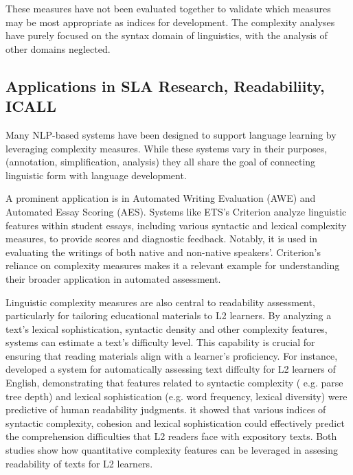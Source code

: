 These measures have
not been evaluated together to validate which measures may be most appropriate as indices for development. The
complexity analyses have purely focused on the syntax domain of linguistics, with the
analysis of other domains neglected.

\subsection{Applications in SLA Research, Readabiliity, ICALL}

Many NLP-based systems have been designed to support language learning by leveraging complexity measures. While these
systems
vary
in their purposes, (annotation, simplification, analysis) they all
share
the goal
of connecting linguistic form with language development.

A prominent application is in Automated Writing Evaluation (AWE) and Automated Essay Scoring (AES). Systems like
ETS's Criterion \citep{criterion2006} analyze linguistic features within student essays, including various syntactic
and lexical complexity measures, to provide scores and diagnostic feedback. Notably, it is used in evaluating
the writings of both native and non-native speakers'.
 Criterion's reliance on complexity measures makes it a relevant example for
understanding their broader application in automated assessment.

Linguistic complexity measures are also central to readability assessment, particularly for tailoring educational
materials to L2 learners. By analyzing a text's lexical sophistication, syntactic density and other complexity
features, systems can estimate a text's difficulty level. This capability is crucial for ensuring that reading
materials align with a learner's proficiency. For instance, \citet{vajjala2012} developed a system for automatically
assessing text diffculty for L2 learners of English, demonstrating that features related to syntactic complexity (
e.g. parse tree depth) and lexical sophistication (e.g. word frequency, lexical diversity) were predictive of human
readability judgments. \citet{crossley2014} it showed that various indices of syntactic complexity, cohesion and
lexical sophistication
could effectively predict the comprehension difficulties that L2 readers face with expository texts. Both studies
show how quantitative complexity features can be leveraged in assesing readability of texts for L2 learners.


